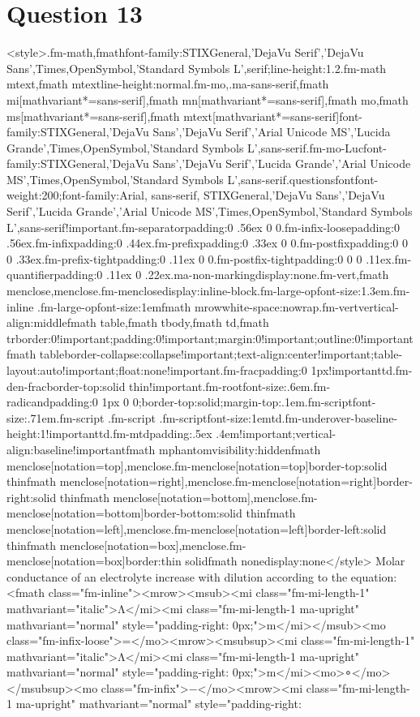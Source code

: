 \documentclass{article}
\begin{document}
\section*{Question 13}
<style>.fm-math,fmath{font-family:STIXGeneral,'DejaVu Serif','DejaVu Sans',Times,OpenSymbol,'Standard Symbols L',serif;line-height:1.2}.fm-math mtext,fmath mtext{line-height:normal}.fm-mo,.ma-sans-serif,fmath mi[mathvariant*=sans-serif],fmath mn[mathvariant*=sans-serif],fmath mo,fmath ms[mathvariant*=sans-serif],fmath mtext[mathvariant*=sans-serif]{font-family:STIXGeneral,'DejaVu Sans','DejaVu Serif','Arial Unicode MS','Lucida Grande',Times,OpenSymbol,'Standard Symbols L',sans-serif}.fm-mo-Luc{font-family:STIXGeneral,'DejaVu Sans','DejaVu Serif','Lucida Grande','Arial Unicode MS',Times,OpenSymbol,'Standard Symbols L',sans-serif}.questionsfont{font-weight:200;font-family:Arial, sans-serif, STIXGeneral,'DejaVu Sans','DejaVu Serif','Lucida Grande','Arial Unicode MS',Times,OpenSymbol,'Standard Symbols L',sans-serif!important}.fm-separator{padding:0 .56ex 0 0}.fm-infix-loose{padding:0 .56ex}.fm-infix{padding:0 .44ex}.fm-prefix{padding:0 .33ex 0 0}.fm-postfix{padding:0 0 0 .33ex}.fm-prefix-tight{padding:0 .11ex 0 0}.fm-postfix-tight{padding:0 0 0 .11ex}.fm-quantifier{padding:0 .11ex 0 .22ex}.ma-non-marking{display:none}.fm-vert,fmath menclose,menclose.fm-menclose{display:inline-block}.fm-large-op{font-size:1.3em}.fm-inline .fm-large-op{font-size:1em}fmath mrow{white-space:nowrap}.fm-vert{vertical-align:middle}fmath table,fmath tbody,fmath td,fmath tr{border:0!important;padding:0!important;margin:0!important;outline:0!important}fmath table{border-collapse:collapse!important;text-align:center!important;table-layout:auto!important;float:none!important}.fm-frac{padding:0 1px!important}td.fm-den-frac{border-top:solid thin!important}.fm-root{font-size:.6em}.fm-radicand{padding:0 1px 0 0;border-top:solid;margin-top:.1em}.fm-script{font-size:.71em}.fm-script .fm-script .fm-script{font-size:1em}td.fm-underover-base{line-height:1!important}td.fm-mtd{padding:.5ex .4em!important;vertical-align:baseline!important}fmath mphantom{visibility:hidden}fmath menclose[notation=top],menclose.fm-menclose[notation=top]{border-top:solid thin}fmath menclose[notation=right],menclose.fm-menclose[notation=right]{border-right:solid thin}fmath menclose[notation=bottom],menclose.fm-menclose[notation=bottom]{border-bottom:solid thin}fmath menclose[notation=left],menclose.fm-menclose[notation=left]{border-left:solid thin}fmath menclose[notation=box],menclose.fm-menclose[notation=box]{border:thin solid}fmath none{display:none}</style> Molar conductance of an electrolyte increase with dilution according to the equation:\newline<fmath class="fm-inline"><mrow><msub><mi class="fm-mi-length-1" mathvariant="italic">Λ</mi><mi class="fm-mi-length-1 ma-upright" mathvariant="normal" style="padding-right: 0px;">m</mi></msub><mo class="fm-infix-loose">=</mo><mrow><msubsup><mi class="fm-mi-length-1" mathvariant="italic">Λ</mi><mi class="fm-mi-length-1 ma-upright" mathvariant="normal" style="padding-right: 0px;">m</mi><mo>∘</mo></msubsup><mo class="fm-infix">−</mo><mrow><mi class="fm-mi-length-1 ma-upright" mathvariant="normal" style="padding-right: 
\end{document}
